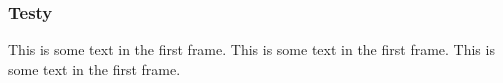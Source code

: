 \begin{frame}
    \frametitle{Testy}
    This is some text in the first frame. This is some text in the first frame. This is some text in the first frame.
\end{frame}